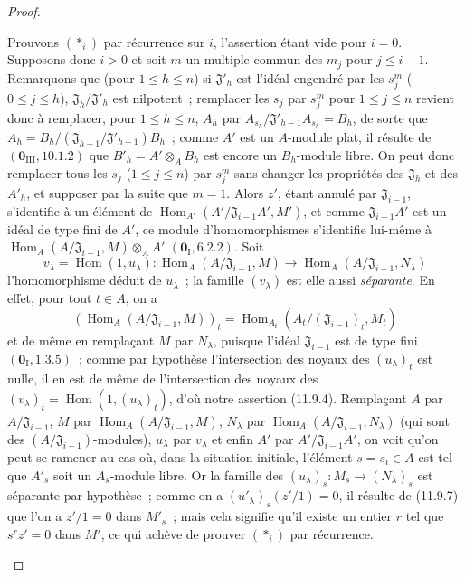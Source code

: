 \begin{proof}
\begin{enumerate}[label=(\roman*)]
  Prouvons $(*_i)$ par récurrence sur $i$, l'assertion étant vide pour $i=0$.
  Supposons donc $i>0$ et soit $m$ un multiple commun des $m_j$ pour
  $j\leq i-1$. Remarquons que (pour $1\leq h\leq n$) si
  $\mathfrak J'_h$ est l'idéal engendré par les $s_j^m$ ($0\leq j\leq h$),
  $\mathfrak J_h/\mathfrak J'_h$ est nilpotent~; remplacer les $s_j$ par
  $s_j^m$ pour $1\leq j\leq n$ revient donc à remplacer, pour
  $1\leq h\leq n$, $A_h$ par
  $A_{s_h}/\mathfrak J'_{h-1}A_{s_h}=B_h$, de sorte que
  $A_h=B_h/(\mathfrak J_{h-1}/\mathfrak J'_{h-1})B_h$~; comme $A'$ est un
  $A$-module plat, il résulte de $(\mathbf 0_{\mathrm{III}},10.1.2)$ que
  $B'_h=A'\otimes_A B_h$ est encore un $B_h$-module libre. On peut donc
  remplacer tous les $s_j$ ($1\leq j\leq n$) par $s_j^m$ sans changer les
  propriétés des $\mathfrak J_h$ et des $A'_h$, et supposer par la suite que
  $m=1$. Alors $z'$, étant annulé par $\mathfrak J_{i-1}$, s'identifie à un
  élément de
  $\operatorname{Hom}_{A'}(A'/\mathfrak J_{i-1}A',M')$, et comme
  $\mathfrak J_{i-1}A'$ est un idéal de type fini de $A'$, ce module
  d'homomorphismes s'identifie lui-même à
  $\operatorname{Hom}_A(A/\mathfrak J_{i-1},M)\otimes_A A'$
  $(\mathbf 0_{\mathrm I},6.2.2)$. Soit
  \[
  v_\lambda=\operatorname{Hom}(1,u_\lambda):
  \operatorname{Hom}_A(A/\mathfrak J_{i-1},M)\longrightarrow
  \operatorname{Hom}_A(A/\mathfrak J_{i-1},N_\lambda)
  \]
  l'homomorphisme déduit de $u_\lambda$~; la famille $(v_\lambda)$ est elle
  aussi \emph{séparante}. En effet, pour tout $t\in A$, on a
  \[
  (\operatorname{Hom}_A(A/\mathfrak J_{i-1},M))_t
  =\operatorname{Hom}_{A_t}(A_t/(\mathfrak J_{i-1})_t,M_t)
  \]
  et de même en remplaçant $M$ par $N_\lambda$, puisque l'idéal
  $\mathfrak J_{i-1}$ est de type fini $(\mathbf 0_{\mathrm I},1.3.5)$~;
  comme par hypothèse l'intersection des noyaux des $(u_\lambda)_t$ est nulle,
  il en est de même de l'intersection des noyaux des
  $(v_\lambda)_t=\operatorname{Hom}(1,(u_\lambda)_t)$, d'où notre assertion
  (11.9.4). Remplaçant $A$ par $A/\mathfrak J_{i-1}$, $M$ par
  $\operatorname{Hom}_A(A/\mathfrak J_{i-1},M)$, $N_\lambda$ par
  $\operatorname{Hom}_A(A/\mathfrak J_{i-1},N_\lambda)$ (qui sont des
  $(A/\mathfrak J_{i-1})$-modules), $u_\lambda$ par $v_\lambda$ et enfin $A'$
  par $A'/\mathfrak J_{i-1}A'$, on voit qu'on peut se ramener au cas où, dans
  la situation initiale, l'élément $s=s_i\in A$ est tel que $A'_s$ soit un
  $A_s$-module libre. Or la famille des
  $(u_\lambda)_s:M_s\to(N_\lambda)_s$ est séparante par hypothèse~; comme on a
  $(u'_\lambda)_s(z'/1)=0$, il résulte de (11.9.7) que l'on a $z'/1=0$ dans
  $M'_s$~; mais cela signifie qu'il existe un entier $r$ tel que $s^rz'=0$
  dans $M'$, ce qui achève de prouver $(*_i)$ par récurrence.
\end{enumerate}
\end{proof}

